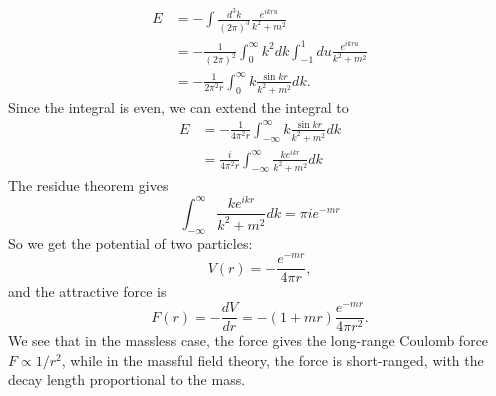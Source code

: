 \begin{equation}
\begin{aligned}
	E &= -\int \frac{d^3 k}{(2\pi)^3} \frac{e^{i k r u}}{k^2 + m^2} \\
	&= - \frac{1}{(2\pi)^2} \int_0^\infty k^2 dk \int_{-1}^1 du \frac{e^{ikru}}{k^2 +m^2} \\
	&= -\frac{1}{2\pi^2 r} \int_0^\infty k  \frac{\sin kr}{k^2 +m^2} dk.
\end{aligned}
\end{equation}
Since the integral is even, we can extend the integral to
\begin{equation}
\begin{aligned}
	E &= -\frac{1}{4\pi^2 r} \int_{-\infty}^\infty k  \frac{\sin kr}{k^2 +m^2} dk \\
	&= \frac{i}{4\pi^2 r} \int_{-\infty}^\infty \frac{k e^{ikr}}{k^2 +m^2} dk
\end{aligned}
\end{equation}
The residue theorem gives
\begin{equation}
	\int_{-\infty}^\infty \frac{k e^{ikr}}{k^2 +m^2} dk = \pi ie^{-mr}
\end{equation}
So we get the potential of two particles:
\begin{equation}\label{eq:field-to-force}
	V(r) = -\frac{e^{-mr}}{4\pi r},
\end{equation}
and the attractive force is
\begin{equation}
	F(r) = -\frac{dV}{dr} = -(1+mr)\frac{e^{-mr}}{4\pi r^2}.
\end{equation}
We see that in the massless case, the force gives the long-range Coulomb force $F \propto 1/r^2$, while in the massful field theory, the force is short-ranged, with the decay length proportional to the mass.


